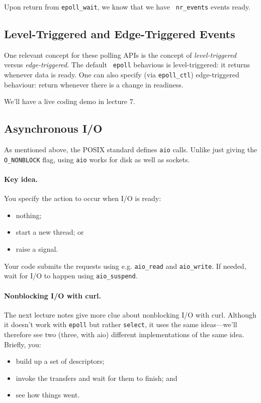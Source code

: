 \documentclass[11pt]{article}
\begin{document}
Upon return from {\tt epoll\_wait}, we know that we have {\tt
  nr\_events} events ready.

\subsection*{Level-Triggered and Edge-Triggered Events}
One relevant concept for these polling APIs is the concept of
\emph{level-triggered} versus \emph{edge-triggered}.  The default {\tt
  epoll} behavious is level-triggered: it returns whenever data is
ready. One can also specify (via {\tt epoll\_ctl}) edge-triggered
behaviour: return whenever there is a change in readiness.

We'll have a live coding demo in lecture 7.

\subsection*{Asynchronous I/O}
As mentioned above, the POSIX standard defines {\tt aio} calls.
Unlike just giving the {\tt O\_NONBLOCK} flag, using {\tt aio} works
for disk as well as sockets.

\paragraph{Key idea.} You specify the action to occur when I/O is ready:
    \begin{itemize}
      \item nothing;
      \item start a new thread; or
      \item raise a signal.
    \end{itemize}

Your code submits the requests using e.g. {\tt aio\_read} and {\tt aio\_write}.
If needed, wait for I/O to happen using {\tt aio\_suspend}.

\paragraph{Nonblocking I/O with curl.} The next lecture notes give more clue
about nonblocking I/O with curl. Although it doesn't work with {\tt epoll}
but rather {\tt select}, it uses the same ideas---we'll therefore see two
(three, with aio) different implementations of the same idea. 
Briefly, you:
\begin{itemize}
\item build up a set of descriptors;
\item invoke the transfers and wait for them to finish; and
\item see how things went.
\end{itemize}
\end{document}
